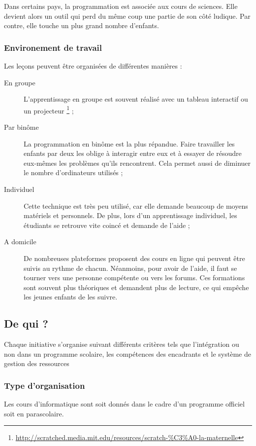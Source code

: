 Dans certains pays, la programmation est associée aux cours de sciences. Elle devient alors un outil qui perd du même coup une partie de son côté ludique. Par contre, elle touche un plus grand nombre d'enfants.\\

\subsubsection{Environement de travail}
\label{paire}
Les leçons peuvent être organisées de différentes manières :
\begin{description}
  \item[En groupe] L'apprentissage en groupe est souvent réalisé avec un tableau interactif ou un projecteur \footnote{\url{http://scratched.media.mit.edu/resources/scratch-\%C3\%A0-la-maternelle}} ;
  \item[Par binôme] La programmation en binôme est la plus répandue. Faire travailler les enfants par deux les oblige à interagir entre eux et à essayer de résoudre eux-mêmes les problèmes qu'ils rencontrent. Cela permet aussi de diminuer le nombre d'ordinateurs utilisés ;
  \item[Individuel] Cette technique est très peu utilisé, car elle demande beaucoup de moyens matériels et personnels. De plus, lors d'un apprentissage individuel, les étudiants se retrouve vite coincé et demande de l'aide ;
  \item[A domicile] De nombreuses plateformes proposent des cours en ligne qui peuvent être suivis au rythme de chacun. Néanmoins, pour avoir de l'aide, il faut se tourner vers une personne compétente ou vers les forums. Ces formations sont souvent plus théoriques et demandent plus de lecture, ce qui empêche les jeunes enfants de les suivre.
\end{description}

\subsection{De qui ?}
Chaque initiative s'organise suivant différents critères tels que l'intégration ou non dans un programme scolaire, les compétences des encadrants et le système de gestion des ressources 

\subsubsection{Type d'organisation} 
Les cours d'informatique sont soit donnés dans le cadre d'un programme officiel soit en parascolaire.

